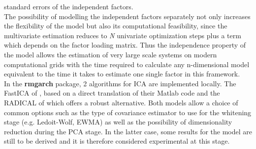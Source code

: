 standard errors of the independent factors.\\
The possibility of modelling the independent factors separately not only increases
the flexibility of the model but also its computational feasibility, since the
multivariate estimation reduces to \emph{N} univariate optimization steps plus a
term which depends on the factor loading matrix. Thus the independence property
of the model allows the estimation of very large scale systems on modern
computational grids with the time required to calculate any n-dimensional
model equivalent to the time it takes to estimate one single factor in this
framework.\\
In the {\bf rmgarch} package, 2 algorithms for ICA are implemented locally. The
FastICA of \cite{Hyvaerinen2000}, based on a direct translation of their Matlab
code and the RADICAL of \cite{Learned-Miller2003} which offers a robust
alternative. Both models allow a choice of common options such as the type of
covariance estimator to use for the whitening stage (e.g. Ledoit-Wolf, EWMA) as
well as the possibility of dimensionality reduction during the PCA stage. In the
latter case, some results for the model are still to be derived and it is therefore
considered experimental at this stage.
